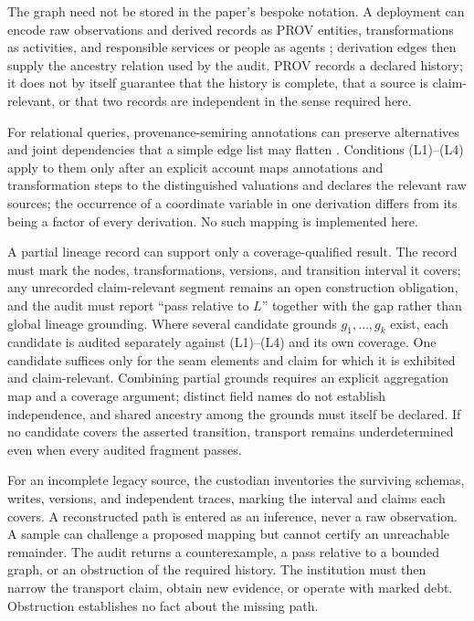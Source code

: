 \documentclass[11pt]{article}
\theoremstyle{definition}
\begin{document}
The graph need not be stored in the paper's bespoke notation. A deployment can encode raw observations and derived records as PROV entities, transformations as activities, and responsible services or people as agents \citep{w3cprovdm2013}; derivation edges then supply the ancestry relation used by the audit. PROV records a declared history; it does not by itself guarantee that the history is complete, that a source is claim-relevant, or that two records are independent in the sense required here.

For relational queries, provenance-semiring annotations can preserve alternatives and joint dependencies that a simple edge list may flatten \citep{greenkarvounarakistannen2007}. Conditions (L1)--(L4) apply to them only after an explicit account maps annotations and transformation steps to the distinguished valuations and declares the relevant raw sources; the occurrence of a coordinate variable in one derivation differs from its being a factor of every derivation. No such mapping is implemented here.

A partial lineage record can support only a coverage-qualified result. The record must mark the nodes, transformations, versions, and transition interval it covers; any unrecorded claim-relevant segment remains an open construction obligation, and the audit must report ``pass relative to $L$'' together with the gap rather than global lineage grounding. Where several candidate grounds $g_1,\ldots,g_k$ exist, each candidate is audited separately against (L1)--(L4) and its own coverage. One candidate suffices only for the seam elements and claim for which it is exhibited and claim-relevant. Combining partial grounds requires an explicit aggregation map and a coverage argument; distinct field names do not establish independence, and shared ancestry among the grounds must itself be declared. If no candidate covers the asserted transition, transport remains underdetermined even when every audited fragment passes.

For an incomplete legacy source, the custodian inventories the surviving schemas, writes, versions, and independent traces, marking the interval and claims each covers. A reconstructed path is entered as an inference, never a raw observation. A sample can challenge a proposed mapping but cannot certify an unreachable remainder. The audit returns a counterexample, a pass relative to a bounded graph, or an obstruction of the required history. The institution must then narrow the transport claim, obtain new evidence, or operate with marked debt. Obstruction establishes no fact about the missing path.
\end{document}
